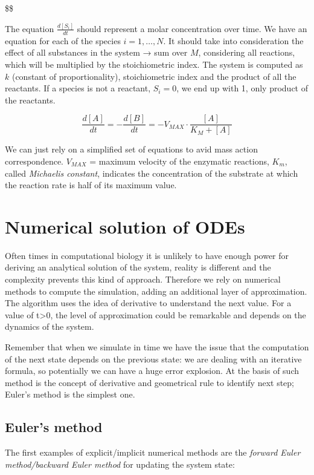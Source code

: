 \$\$

The equation $\frac{d[S_i]}{dt}$ should represent a molar concentration
over time. We have an equation for each of the species $i=1,…,N$. It
should take into consideration the effect of all substances in the
system → sum over $M$, considering all reactions, which will be
multiplied by the stoichiometric index. The system is computed as $k$
(constant of proportionality), stoichiometric index and the product of
all the reactants. If a species is not a reactant, $S_i=0$, we end up
with 1, only product of the reactants.

$$
\frac{d[A]}{dt} = - \frac{d[B]}{dt}= -V_{MAX} \cdot \frac{[A]}{K_M+[A]}
$$

We can just rely on a simplified set of equations to avid mass action
correspondence. $V_{MAX}$ = maximum velocity of the enzymatic reactions,
$K_m$, called \emph{Michaelis constant}, indicates the concentration of
the substrate at which the reaction rate is half of its maximum value.

\hypertarget{numerical-solution-of-odes}{%
\section{Numerical solution of ODEs}\label{numerical-solution-of-odes}}

Often times in computational biology it is unlikely to have enough power
for deriving an analytical solution of the system, reality is different
and the complexity prevents this kind of approach. Therefore we rely on
numerical methods to compute the simulation, adding an additional layer
of approximation. The algorithm uses the idea of derivative to
understand the next value. For a value of t\textgreater0, the level of
approximation could be remarkable and depends on the dynamics of the
system.

Remember that when we simulate in time we have the issue that the
computation of the next state depends on the previous state: we are
dealing with an iterative formula, so potentially we can have a huge
error explosion. At the basis of such method is the concept of
derivative and geometrical rule to identify next step; Euler's method is
the simplest one.

\hypertarget{eulers-method}{%
\subsection{Euler's method}\label{eulers-method}}

The first examples of explicit/implicit numerical methods are the
\emph{forward Euler method/backward Euler method} for updating the
system state:

